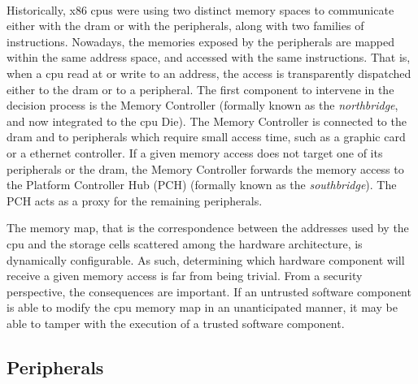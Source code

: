 
\paragraph{}
%
Historically, x86 \acp{cpu} were using two distinct memory spaces to communicate
either with the \ac{dram} or with the peripherals, along with two families of
instructions.
%
Nowadays, the memories exposed by the peripherals are mapped within the same
address space, and accessed with the same instructions.
%
That is, when a \ac{cpu} read at or write to an address, the access is
transparently dispatched either to the \ac{dram} or to a peripheral.
%
The first component to intervene in the decision process is the Memory
Controller (formally known as the \emph{northbridge}, and now integrated to the
\ac{cpu} Die).
%
The Memory Controller is connected to the \ac{dram} and to peripherals which
require small access time, such as a graphic card or a ethernet controller.
%
If a given memory access does not target one of its peripherals or the
\ac{dram}, the Memory Controller forwards the memory access to the Platform
Controller Hub (PCH) (formally known as the \emph{southbridge}).
%
The PCH acts as a proxy for the remaining peripherals.

The memory map, that is the correspondence between the addresses used by the
\ac{cpu} and the storage cells scattered among the hardware architecture, is
dynamically configurable.
%
As such, determining which hardware component will receive a given memory access
is far from being trivial.
%
From a security perspective, the consequences are important.
%
If an untrusted software component is able to modify the \ac{cpu} memory map in
an unanticipated manner, it may be able to tamper with the execution of a
trusted software component.

\subsection{Peripherals}
\label{subsec:usecase:perif}


